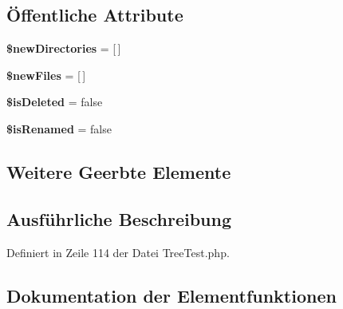 \subsection*{Öffentliche Attribute}
\begin{DoxyCompactItemize}
\item 
\mbox{\label{class_sabre_1_1_d_a_v_1_1_tree_directory_tester_a286160f218af1d6a8e3a166050e56e69}} 
{\bfseries \$new\+Directories} = \mbox{[}$\,$\mbox{]}
\item 
\mbox{\label{class_sabre_1_1_d_a_v_1_1_tree_directory_tester_a711e8e17535754475624b8f5bed28eb7}} 
{\bfseries \$new\+Files} = \mbox{[}$\,$\mbox{]}
\item 
\mbox{\label{class_sabre_1_1_d_a_v_1_1_tree_directory_tester_af2e91e96d19afcf508adbbf4d874c62e}} 
{\bfseries \$is\+Deleted} = false
\item 
\mbox{\label{class_sabre_1_1_d_a_v_1_1_tree_directory_tester_a84f0de80da4f366316271e36075d989b}} 
{\bfseries \$is\+Renamed} = false
\end{DoxyCompactItemize}
\subsection*{Weitere Geerbte Elemente}


\subsection{Ausführliche Beschreibung}


Definiert in Zeile 114 der Datei Tree\+Test.\+php.



\subsection{Dokumentation der Elementfunktionen}
\mbox{\label{class_sabre_1_1_d_a_v_1_1_tree_directory_tester_aa220332b01cdebf6cfdbfb23a4808849}} 

